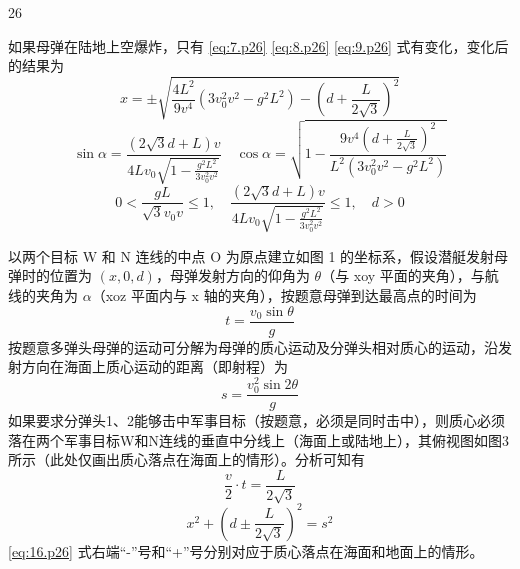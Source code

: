 \begin{solution}{26}
\begin{subproblem}[参考解答（一）]
    如果母弹在陆地上空爆炸，只有 \eqref{eq:7.p26} \eqref{eq:8.p26} \eqref{eq:9.p26} 式有变化，变化后的结果为
    \begin{equation}
      x = \pm \sqrt{\frac{4 L^{2}}{9 v^{4}} (3 v_{0}^{2} v^{2} - g^{2} L^{2}) - (d + \frac{L}{2 \sqrt{3}})^{2}}
      \label{eq:10.p26}
    \end{equation}
    \begin{equation}
      \sin \alpha = \frac{(2 \sqrt{3} d + L) v}{4 L v_{0} \sqrt{1 - \frac{g^{2} L^{2}}{3 v_{0}^{2} v^{2}}}} \quad \cos \alpha = \sqrt{1 - \frac{9 v^{4} \left(d + \frac{L}{2 \sqrt{3}}\right)^{2}}{L^{2} (3 v_{0}^{2} v^{2} - g^{2} L^{2})}}
      \label{eq:11.p26}
    \end{equation}
    \begin{equation}
      0 < \frac{g L}{\sqrt{3} v_{0} v} \leq 1, \quad \frac{(2 \sqrt{3} d + L) v}{4 L v_{0} \sqrt{1 - \frac{g^{2} L^{2}}{3 v_{0}^{2} v^{2}}}} \leq 1, \quad d > 0
      \label{eq:12.p26}
    \end{equation}
  \end{subproblem}
  \begin{subproblem}[参考解答（二）]
    以两个目标 W 和 N 连线的中点 O 为原点建立如图 1 的坐标系，假设潜艇发射母弹时的位置为 $(x,0,d)$，母弹发射方向的仰角为 $\theta$（与 xoy 平面的夹角），与航线的夹角为 $\alpha$（xoz 平面内与 x 轴的夹角），按题意母弹到达最高点的时间为
    \begin{equation}
      t = \frac{v_{0} \sin \theta}{g}
      \label{eq:13.p26}
    \end{equation}
    按题意多弹头母弹的运动可分解为母弹的质心运动及分弹头相对质心的运动，沿发射方向在海面上质心运动的距离（即射程）为
    \begin{equation}
      s = \frac{v_{0}^{2} \sin 2\theta}{g}
      \label{eq:14.p26}
    \end{equation}
    如果要求分弹头1、2能够击中军事目标（按题意，必须是同时击中），则质心必须落在两个军事目标W和N连线的垂直中分线上（海面上或陆地上），其俯视图如图3所示（此处仅画出质心落点在海面上的情形）。分析可知有
    \begin{equation}
      \frac{v}{2} \cdot t = \frac{L}{2 \sqrt{3}}
      \label{eq:15.p26}
    \end{equation}
    \begin{equation}
      x^{2} + \left(d \pm \frac{L}{2 \sqrt{3}}\right)^{2} = s^{2}
      \label{eq:16.p26}
    \end{equation}
    \eqref{eq:16.p26} 式右端“-”号和“+”号分别对应于质心落点在海面和地面上的情形。


\end{subproblem}
\end{solution}
